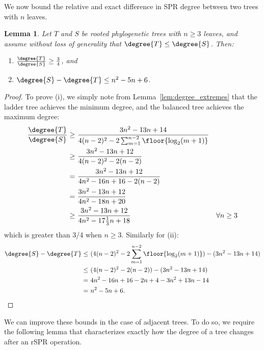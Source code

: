 \documentclass{amsart}
\newtheorem{lemma}[theorem]{Lemma}
\newcommand{\cuttable}[1]{#1} %
\begin{document}
We now bound the relative and exact difference in SPR degree between two trees with $n$ leaves.

\begin{lemma}
	\label{lem:degree_max_delta}
	Let $T$ and $S$ be rooted phylogenetic trees with $n \ge 3$ leaves, and assume without loss of generality that $\degree{T} \le \degree{S}$.
	Then:
	\begin{enumerate}
		\item $\frac{\degree{T}}{\degree{S}} \ge \frac{3}{4}$, and
		\item $\degree{S} - \degree{T} \le n^2 - 5n + 6$.
	\end{enumerate}
\end{lemma}
\begin{proof}
	To prove (i), we simply note from Lemma~\ref{lem:degree_extremes} that the ladder tree achieves the minimum degree, and the balanced tree achieves the maximum degree:
	\begin{align*}
		\frac{\degree{T}}{\degree{S}} \ge\ &\frac{3n^2 - 13n + 14}{4(n-2)^2 - 2 \sum_{m=1}^{n-2} \floor{\log_2(m+1)}} \\
		\ge\ &\frac{3n^2 - 13n + 12}{4(n-2)^2 - 2(n-2)} \\
		\cuttable{= \ &\frac{3n^2 - 13n + 12}{4n^2 - 16n + 16 - 2(n-2)} \\}
		= \ &\frac{3n^2 - 13n + 12}{4n^2 - 18n + 20} \\
		\cuttable{\ge\ &\frac{3n^2 - 13n + 12}{4n^2 - 17\frac{1}{3}n + 18} &\forall n \ge 3 \\}
	\end{align*}
	which is greater than 3/4 when $n \ge 3$.
    Similarly for (ii):
	\begin{align*}
		\cuttable{\degree{S} - \degree{T}
		\le\ &(4(n-2)^2 - 2 \sum_{m=1}^{n-2} \floor{\log_2(m+1)})
		- (3n^2 - 13n + 14) \\}
		\le\ &(4(n-2)^2 - 2(n-2)) - (3n^2 - 13n + 14) \\
		\cuttable{=\ &4n^2 - 16n + 16 - 2n +4 - 3n^2 + 13n - 14 \\}
		=\ &n^2 - 5n + 6.
	\end{align*}
\end{proof}

We can improve these bounds in the case of adjacent trees.
To do so, we require the following lemma that characterizes exactly how the degree of a tree changes after an rSPR operation.
\end{document}
